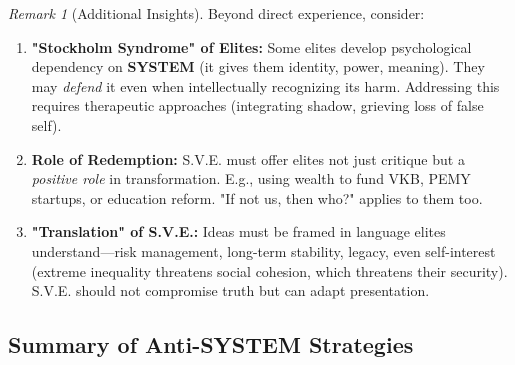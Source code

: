 \documentclass[11pt,a4paper]{article}
\newcommand{\SYSTEM}{\textbf{SYSTEM}}
\theoremstyle{definition}
\theoremstyle{remark}
\newtheorem{remark}{Remark}[section]
\begin{document}
\begin{remark}[Additional Insights]
Beyond direct experience, consider:

\begin{enumerate}
\item \textbf{"Stockholm Syndrome" of Elites:} Some elites develop psychological dependency on \SYSTEM{} (it gives them identity, power, meaning). They may \textit{defend} it even when intellectually recognizing its harm. Addressing this requires therapeutic approaches (integrating shadow, grieving loss of false self).

\item \textbf{Role of Redemption:} S.V.E. must offer elites not just critique but a \textit{positive role} in transformation. E.g., using wealth to fund VKB, PEMY startups, or education reform. "If not us, then who?" applies to them too.

\item \textbf{"Translation" of S.V.E.:} Ideas must be framed in language elites understand—risk management, long-term stability, legacy, even self-interest (extreme inequality threatens social cohesion, which threatens their security). S.V.E. should not compromise truth but can adapt presentation.
\end{enumerate}
\end{remark}

\subsection{Summary of Anti-\SYSTEM{} Strategies}
\end{document}
